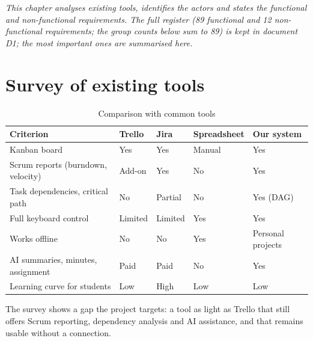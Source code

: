 \documentclass[../main.tex]{subfiles}
\begin{document}
\textit{This chapter analyses existing tools, identifies the actors and states the functional and
non-functional requirements. The full register (89 functional and 12 non-functional requirements; the group counts below sum to 89)
is kept in document D1; the most important ones are summarised here.}

\section{Survey of existing tools}
\begin{table}[H]
\centering
\caption{Comparison with common tools}\label{tab:survey}
\renewcommand{\arraystretch}{1.25}
\begin{tabular}{|p{3.4cm}|p{1.9cm}|p{1.9cm}|p{2.3cm}|p{2.8cm}|}
\hline
\textbf{Criterion} & \textbf{Trello} & \textbf{Jira} & \textbf{Spreadsheet} & \textbf{Our system} \\ \hline
Kanban board & Yes & Yes & Manual & Yes \\ \hline
Scrum reports (burndown, velocity) & Add-on & Yes & No & Yes \\ \hline
Task dependencies, critical path & No & Partial & No & Yes (DAG) \\ \hline
Full keyboard control & Limited & Limited & Yes & Yes \\ \hline
Works offline & No & No & Yes & Personal projects \\ \hline
AI summaries, minutes, assignment & Paid & Paid & No & Yes \\ \hline
Learning curve for students & Low & High & Low & Low \\ \hline
\end{tabular}
\end{table}

The survey shows a gap the project targets: a tool as light as Trello that still offers Scrum
reporting, dependency analysis and AI assistance, and that remains usable without a connection.
\end{document}
